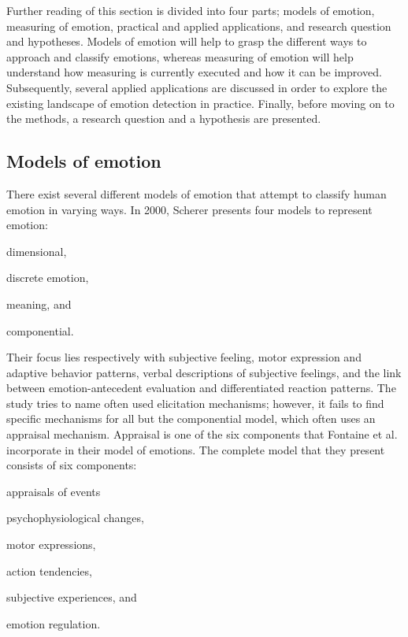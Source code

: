 \documentclass{sigchi}
\begin{document}
Further reading of this section is divided into four parts; models of emotion, measuring of emotion, practical and applied applications, and research question and hypotheses. Models of emotion will help to grasp the different ways to approach and classify emotions, whereas measuring of emotion will help understand how measuring is currently executed and how it can be improved. Subsequently, several applied applications are discussed in order to explore the existing landscape of emotion detection in practice. Finally, before moving on to the methods, a research question and a hypothesis are presented.

\subsection{Models of emotion} %
\label{sub:models_of_emotion}
There exist several different models of emotion that attempt to classify human emotion in varying ways. In 2000, Scherer \cite{scherer2000} presents four models to represent emotion:
\begin{enumerate*}[label=(\alph*)]
  \item dimensional,
  \item discrete emotion,
  \item meaning, and
  \item componential.
\end{enumerate*}
Their focus lies respectively with subjective feeling, motor expression and adaptive behavior patterns, verbal descriptions of subjective feelings, and the link between emotion-antecedent evaluation and differentiated reaction patterns. The study tries to name often used elicitation mechanisms; however, it fails to find specific mechanisms for all but the componential model, which often uses an appraisal mechanism. Appraisal is one of the six components that Fontaine et al. \cite{Fontaine2007} incorporate in their model of emotions. The complete model that they present consists of six components:
\begin{enumerate*}[label=(\alph*)]
  \item appraisals of events
  \item psychophysiological changes,
  \item motor expressions,
  \item action tendencies,
  \item subjective experiences, and
  \item emotion regulation.
\end{enumerate*}
\end{document}

